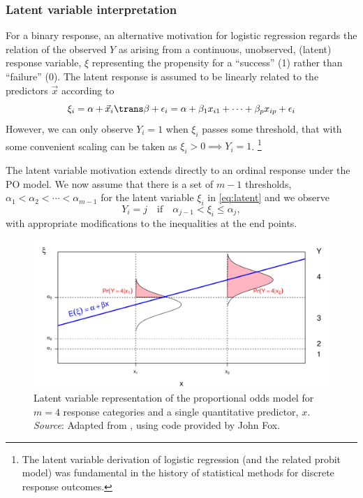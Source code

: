 \documentclass[11pt]{book}
\begin{document}
\subsubsection{Latent variable interpretation}
For a binary response, an alternative motivation for logistic regression
regards the relation of the observed $Y$ as arising from a continuous, unobserved,
(latent) response variable, $\xi$ representing the propensity for a
``success'' (1) rather than ``failure'' (0).  
The latent response is assumed to be linearly related to the predictors $\vec{x}$
according to 
\begin{equation}\label{eq:latent}
 \xi_i = \alpha + \vec{x}_i \trans \beta + \epsilon_i 
        = \alpha + \beta_1 x_{i1} + \cdots + \beta_p x_{ip} + \epsilon_i
\end{equation}
However, we can only observe $Y_i =1$ when $\xi_i$ passes some threshold,
that with some convenient scaling can be taken as
$\xi_i > 0 \implies Y_i=1$.%
\footnote{
The latent variable derivation of logistic regression (and the related probit model)
was fundamental in the history of statistical methods for discrete response outcomes.
}

The latent variable motivation extends directly to an ordinal response under the PO model. 
We now assume that there is a set of $m-1$ thresholds,
$\alpha_1 < \alpha_2 < \cdots < \alpha_{m-1}$ for the latent variable
$\xi_i$ in \eqref{eq:latent} and we observe
\begin{equation*}
  Y_i = j \quad \mbox{if} \quad \alpha_{j-1} < \xi_i \le \alpha_j \comma
\end{equation*}
with appropriate modifications to the inequalities at the end points.  


\begin{figure}
 \centering
 \includegraphics[width=.9\textwidth]{ch07/fig/latent}
 \caption{Latent variable representation of the proportional odds model for $m=4$ response categories and a single quantitative predictor, $x$.
 \emph{Source}: Adapted from \citet[Fig 14.10]{Fox:2008}, using code provided by John Fox.}
 \label{fig:latent}
\end{figure}
\end{document}
